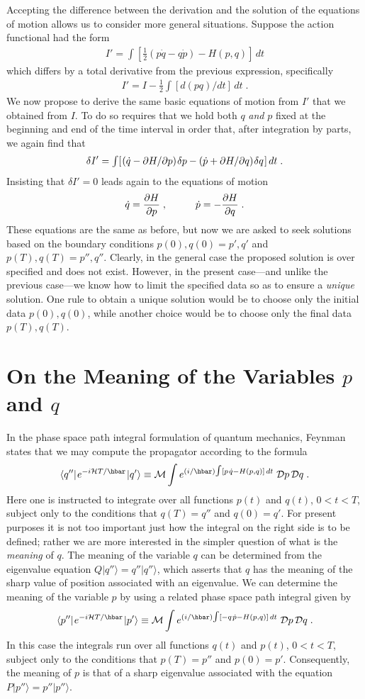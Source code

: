 \documentclass[12pt]{article}
\def\half{\textstyle{\frac{1}{2}}}
\def\H{{\cal H}}
\def\D{{\cal D}}
\def\tint{{\textstyle\int}}
\def\s{\hskip.08em}
\def\d{\partial}
\def\bn{\begin{eqnarray}}     %
\def\en{\end{eqnarray}}       %
\def\<{\langle}
\def\>{\rangle}
\begin{document}
Accepting the difference between the derivation and the solution of the 
equations of motion allows us to consider more general situations. 
Suppose the action functional had the form
  \bn I'=\tint[\half(p{\dot q}-q{\dot p})-H(p,q)]\,dt  \en
which differs by a total derivative from the previous expression, 
specifically
  \bn  I'=I -\half\tint [d(pq)/dt]\,dt \;.  \en
We now propose to derive the same basic equations of motion from $I'$ that 
we obtained from $I$. To do so requires that we hold both $q$ 
{\it and} $p$ fixed at the beginning and end of the time interval in 
order that, after integration by parts, we again find that
  \bn \delta I'=\tint[\s({\dot q}-\d H/\d p)\s\delta p-({\dot p}+
\d H/\d q)\s\delta q\s]\,dt\;.  \en
Insisting that $\delta I'=0$ leads again to the equations of motion
  \bn {\dot q}=\frac{\d H}{\d p}\;,\hskip1cm{\dot p}=-\frac{\d H}{\d q}\;. \en
These equations are the same as before, but now we are asked to seek 
solutions based on the boundary conditions $p(0),q(0)=p',q'$ and 
$p(T),q(T)=p'',q''$. Clearly, in the general case the proposed solution 
is over specified and does not exist. However, in the present case---and 
unlike the previous case---we know how to limit the specified data so as 
to ensure a {\it unique} solution. One rule to obtain a unique solution 
would be to choose only the initial data $p(0),q(0)$, while another 
choice would be to choose only the final data $p(T),q(T)$.

\section{On the Meaning of the Variables $p$ and $q$}
In the phase space path integral formulation of quantum mechanics, 
Feynman \cite{fey} states that we may compute the propagator according 
to the formula
 \bn \<q''|\s e^{-i\H T/\hbar}\s|q'\>\equiv {\cal M}\int 
e^{(i/\hbar)\tint[p\s{\dot q}-H(p,q)]\,dt}\;\D p\, \D q\;.  \label{e12}\en
Here one is instructed to integrate over all functions $p(t)$ and 
$q(t)$, $0<t<T$, subject only to the conditions that $q(T)=q''$ and 
$q(0)=q'$. 
For present purposes it is not too important just how the integral on 
the right side is to be defined; rather we are more interested in the 
simpler question of what is the {\it meaning} of $q$. The meaning of the 
variable $q$ can be determined from the eigenvalue equation 
$Q|q''\>=q''|q''\>$, which asserts that $q$ has the meaning of the 
sharp value of position associated with an eigenvalue. We can determine 
the meaning of the variable $p$ by using a related phase space path 
integral given by
  \bn \<p''|\s e^{-i\H T/\hbar}\s|p'\>\equiv{\cal M}\int 
e^{(i/\hbar)\tint[-q\s{\dot p}-H(p,q)]\,dt}\;\D p\,\D q\;.  \label{e13}\en
In this case the integrals run over all functions $q(t)$ and $p(t)$, 
$0<t<T$, subject only to the conditions that $p(T)=p''$ and $p(0)=p'$. 
Consequently, the meaning of $p$ is that of a sharp eigenvalue associated 
with the equation $P|p''\>=p''|p''\>$.
\end{document}
